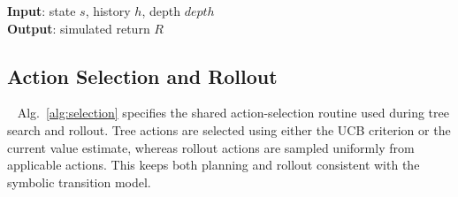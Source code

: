 \begin{algorithm}[h]
\caption{POMCP Simulation with Applicable Actions}
\label{alg:simulate}
\textbf{Input}: state $s$, history $h$, depth $depth$ \\
\textbf{Output}: simulated return $R$
\BlankLine

\end{algorithm}

\subsection{Action Selection and Rollout}~\label{appx:alg_selection}
Alg.~\ref{alg:selection} specifies the shared action-selection routine used during tree search and rollout. Tree actions are selected using either the UCB criterion or the current value estimate, whereas rollout actions are sampled uniformly from applicable actions. This keeps both planning and rollout consistent with the symbolic transition model.

